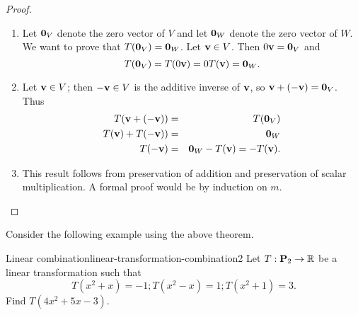 \begin{proof}
  \begin{enumerate}
  \item Let $\mbox{\bf 0}_V$ denote the zero vector of $V$ and let
    $\mbox{\bf 0}_W$ denote the zero vector of $W$.  We want to prove that
    $T(\mbox{\bf 0}_V)=\mbox{\bf 0}_W$.  Let $\mbox{\bf v}\in V$.  Then
    $0\mbox{\bf v}=\mbox{\bf 0}_V$ and
    \begin{equation*}
      T(\mbox{\bf 0}_V)=T(0\mbox{\bf v})=0T(\mbox{\bf v})=\mbox{\bf 0}_W.
    \end{equation*}
  \item Let $\mbox{\bf v}\in V$; then $-\mbox{\bf v}\in V$ is the additive
    inverse of $\mbox{\bf v}$, so $\mbox{\bf v} + (-\mbox{\bf v})=\mbox{\bf 0}_V$.
    Thus
    \begin{eqnarray*}
      T(\mbox{\bf v} + (-\mbox{\bf v})) & = & T(\mbox{\bf 0}_V) \\
      T(\mbox{\bf v}) + T(-\mbox{\bf v})) & = & \mbox{\bf 0}_W \\
      T(-\mbox{\bf v}) & = & \mbox{\bf 0}_W - T(\mbox{\bf v}) =  - T(\mbox{\bf v}).
    \end{eqnarray*}
  \item This result follows from preservation of addition and
    preservation of scalar multiplication.  A formal proof would be by
    induction on $m$.
  \end{enumerate}
\end{proof}

Consider the following example using the above theorem.

\begin{example}{Linear combination}{linear-transformation-combination2}
  Let $T:\mathbf{P}_2 \to \mathbb{R}$ be a linear transformation such that
  \begin{equation*}
    T(x^2+x)=-1; T(x^2-x)=1; T(x^2+1)=3.
  \end{equation*}
  Find $T(4x^2+5x-3)$.
\end{example}

